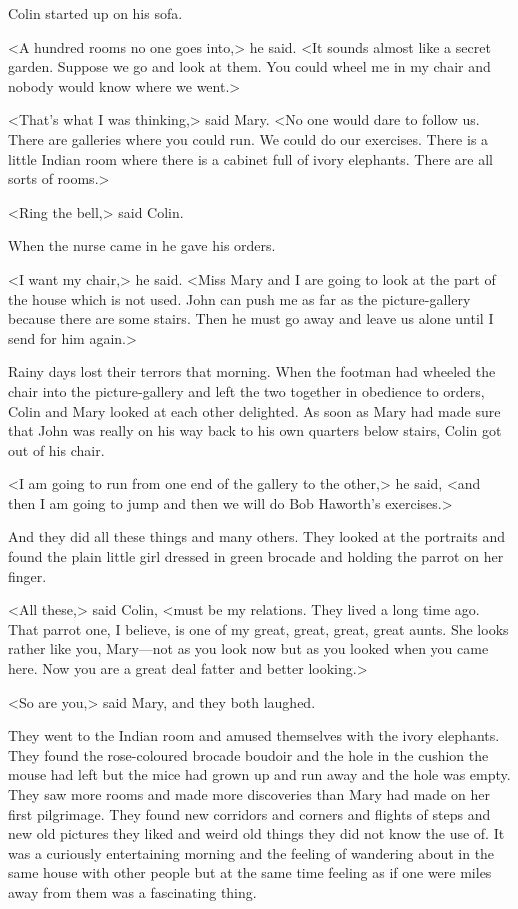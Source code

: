 Colin started up on his sofa.

<A hundred rooms no one goes into,> he said. <It sounds almost like a secret garden. Suppose we go and look at them. You could wheel me in my chair and nobody would know where we went.>

<That's what I was thinking,> said Mary. <No one would dare to follow us. There are galleries where you could run. We could do our exercises. There is a little Indian room where there is a cabinet full of ivory elephants. There are all sorts of rooms.>

<Ring the bell,> said Colin.

When the nurse came in he gave his orders.

<I want my chair,> he said. <Miss Mary and I are going to look at the part of the house which is not used. John can push me as far as the picture-gallery because there are some stairs. Then he must go away and leave us alone until I send for him again.>

Rainy days lost their terrors that morning. When the footman had wheeled the chair into the picture-gallery and left the two together in obedience to orders, Colin and Mary looked at each other delighted. As soon as Mary had made sure that John was really on his way back to his own quarters below stairs, Colin got out of his chair.

<I am going to run from one end of the gallery to the other,> he said, <and then I am going to jump and then we will do Bob Haworth's exercises.>

And they did all these things and many others. They looked at the portraits and found the plain little girl dressed in green brocade and holding the parrot on her finger.

<All these,> said Colin, <must be my relations. They lived a long time ago. That parrot one, I believe, is one of my great, great, great, great aunts. She looks rather like you, Mary—not as you look now but as you looked when you came here. Now you are a great deal fatter and better looking.>

<So are you,> said Mary, and they both laughed.

They went to the Indian room and amused themselves with the ivory elephants. They found the rose-coloured brocade boudoir and the hole in the cushion the mouse had left but the mice had grown up and run away and the hole was empty. They saw more rooms and made more discoveries than Mary had made on her first pilgrimage. They found new corridors and corners and flights of steps and new old pictures they liked and weird old things they did not know the use of. It was a curiously entertaining morning and the feeling of wandering about in the same house with other people but at the same time feeling as if one were miles away from them was a fascinating thing.

